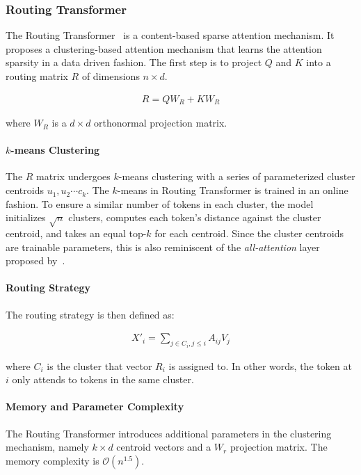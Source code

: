 \subsubsection{Routing Transformer} The Routing Transformer~\citep{roy2020efficient} is a content-based sparse attention mechanism. It proposes a clustering-based attention mechanism that learns the attention sparsity in a data driven fashion. The first step is to project $Q$ and $K$ into a routing matrix $R$ of dimensions $n \times d$.

\begin{align}
R = QW_R + KW_R     
\end{align}

where $W_R$ is a $d \times d$ orthonormal projection matrix. 

\paragraph{$k$-means Clustering} The $R$ matrix undergoes $k$-means clustering with a series of parameterized cluster centroids $u_1, u_2 \cdots c_k$. The $k$-means in Routing Transformer is trained in an online fashion. To ensure a similar number of tokens in each cluster, the model initializes $\sqrt{n}$ clusters, computes each token's distance against the cluster centroid, and takes an equal top-$k$ for each centroid. Since the cluster centroids are trainable parameters, this is also reminiscent of the \emph{all-attention} layer proposed by~\citep{sukhbaatar2019augmenting}. 

\paragraph{Routing Strategy} The routing strategy is then defined as:

\begin{align}
X'_i = \sum_{j \in C_i, j \leq i} A_{ij} V_j    
\end{align}

where $C_i$ is the cluster that vector $R_i$ is assigned to. In other words, the token at $i$ only attends to tokens in the same cluster. 

\paragraph{Memory and Parameter Complexity} The Routing Transformer introduces additional parameters in the clustering mechanism, namely $k \times d$ centroid vectors and a $W_r$ projection matrix. The memory complexity is $\mathcal{O}(n^{1.5})$. 

